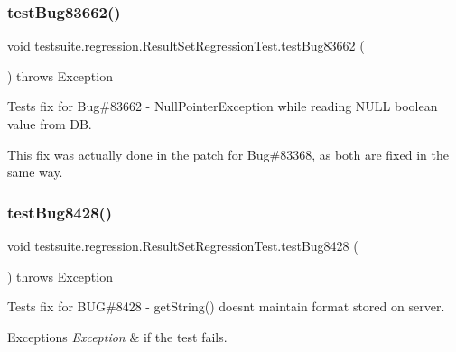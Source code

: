 \subsubsection{\texorpdfstring{test\+Bug83662()}{testBug83662()}}
{\footnotesize\ttfamily void testsuite.\+regression.\+Result\+Set\+Regression\+Test.\+test\+Bug83662 (\begin{DoxyParamCaption}{ }\end{DoxyParamCaption}) throws Exception}

Tests fix for Bug\#83662 -\/ Null\+Pointer\+Exception while reading N\+U\+LL boolean value from DB.

This fix was actually done in the patch for Bug\#83368, as both are fixed in the same way. \mbox{\label{classtestsuite_1_1regression_1_1_result_set_regression_test_a195b8d1a9669b382f6b4dc0b8866224c}} 
\subsubsection{\texorpdfstring{test\+Bug8428()}{testBug8428()}}
{\footnotesize\ttfamily void testsuite.\+regression.\+Result\+Set\+Regression\+Test.\+test\+Bug8428 (\begin{DoxyParamCaption}{ }\end{DoxyParamCaption}) throws Exception}

Tests fix for B\+UG\#8428 -\/ get\+String() doesn\textquotesingle{}t maintain format stored on server.


\begin{DoxyExceptions}{Exceptions}
{\em Exception} & if the test fails. \\
\hline
\end{DoxyExceptions}
\mbox{\label{classtestsuite_1_1regression_1_1_result_set_regression_test_a2d7ec45736b6d8ba77d988e4dae8c5a0}} 
